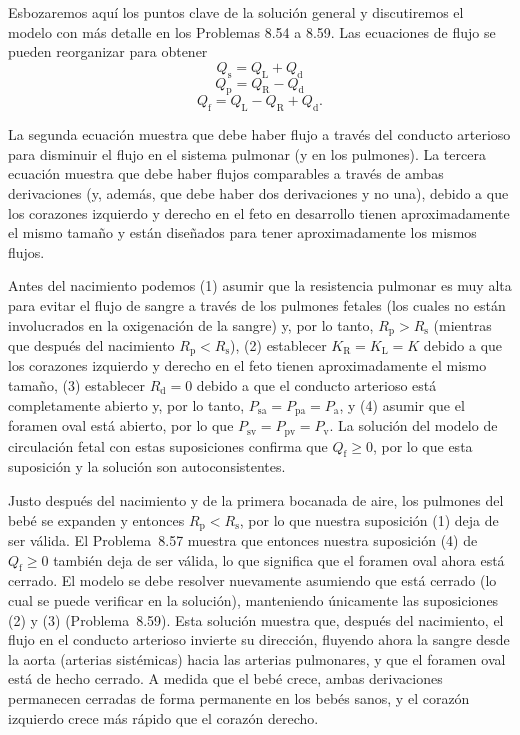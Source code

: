 \documentclass[12pt]{book}
\begin{document}
Esbozaremos aquí los puntos clave de la solución general y discutiremos el modelo con más detalle en los Problemas 8.54 a 8.59. Las ecuaciones de flujo se pueden reorganizar para obtener
\begin{equation}
Q_{\text{s}} = Q_{\text{L}} + Q_{\text{d}}
\label{eq:890}
\end{equation}
\begin{equation}
Q_{\text{p}} = Q_{\text{R}} - Q_{\text{d}}
\label{eq:891}
\end{equation}
\begin{equation}
Q_{\text{f}} = Q_{\text{L}} - Q_{\text{R}} + Q_{\text{d}}.
\label{eq:892}
\end{equation}

La segunda ecuación muestra que debe haber flujo a través del conducto arterioso para disminuir el flujo en el sistema pulmonar (y en los pulmones). La tercera ecuación muestra que debe haber flujos comparables a través de ambas derivaciones (y, además, que debe haber dos derivaciones y no una), debido a que los corazones izquierdo y derecho en el feto en desarrollo tienen aproximadamente el mismo tamaño y están diseñados para tener aproximadamente los mismos flujos.

Antes del nacimiento podemos (1) asumir que la resistencia pulmonar es muy alta para evitar el flujo de sangre a través de los pulmones fetales (los cuales no están involucrados en la oxigenación de la sangre) y, por lo tanto, $R_{\text{p}} > R_{\text{s}}$ (mientras que después del nacimiento $R_{\text{p}} < R_{\text{s}}$), (2) establecer $K_{\text{R}} = K_{\text{L}} = K$ debido a que los corazones izquierdo y derecho en el feto tienen aproximadamente el mismo tamaño, (3) establecer $R_{\text{d}} = 0$ debido a que el conducto arterioso está completamente abierto y, por lo tanto, $P_{\text{sa}} = P_{\text{pa}} = P_{\text{a}}$, y (4) asumir que el foramen oval está abierto, por lo que $P_{\text{sv}} = P_{\text{pv}} = P_{\text{v}}$. La solución del modelo de circulación fetal con estas suposiciones confirma que $Q_{\text{f}} \ge 0$, por lo que esta suposición y la solución son autoconsistentes.

Justo después del nacimiento y de la primera bocanada de aire, los pulmones del bebé se expanden y entonces $R_{\text{p}} < R_{\text{s}}$, por lo que nuestra suposición (1) deja de ser válida. El Problema~8.57 muestra que entonces nuestra suposición (4) de $Q_{\text{f}} \ge 0$ también deja de ser válida, lo que significa que el foramen oval ahora está cerrado. El modelo se debe resolver nuevamente asumiendo que está cerrado (lo cual se puede verificar en la solución), manteniendo únicamente las suposiciones (2) y (3) (Problema~8.59). Esta solución muestra que, después del nacimiento, el flujo en el conducto arterioso invierte su dirección, fluyendo ahora la sangre desde la aorta (arterias sistémicas) hacia las arterias pulmonares, y que el foramen oval está de hecho cerrado. A medida que el bebé crece, ambas derivaciones permanecen cerradas de forma permanente en los bebés sanos, y el corazón izquierdo crece más rápido que el corazón derecho.
\end{document}
